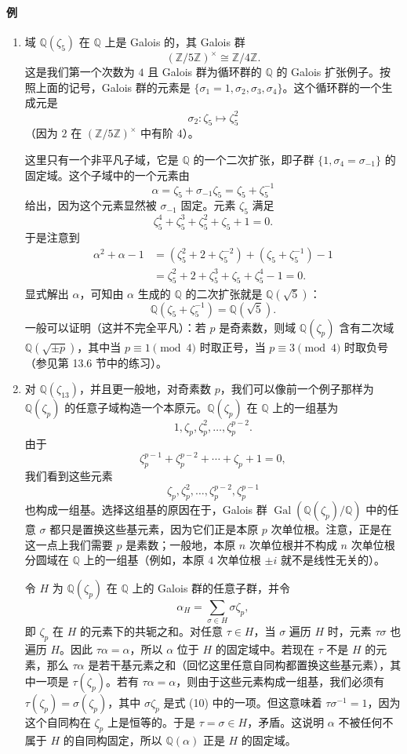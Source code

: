 \paragraph{例}
\begin{enumerate}[label=(\arabic*)]
\item 域 $\mathbb Q(\zeta_5)$ 在 $\mathbb Q$ 上是 Galois 的，其 Galois 群
\[
(\mathbb Z/5\mathbb Z)^\times\cong \mathbb Z/4\mathbb Z.
\]
这是我们第一个次数为 $4$ 且 Galois 群为循环群的 $\mathbb Q$ 的 Galois 扩张例子。按照上面的记号，Galois 群的元素是 $\{\sigma_1=1,\sigma_2,\sigma_3,\sigma_4\}$。这个循环群的一个生成元是
\[
\sigma_2:\zeta_5\longmapsto \zeta_5^2
\]
（因为 $2$ 在 $(\mathbb Z/5\mathbb Z)^\times$ 中有阶 $4$）。

这里只有一个非平凡子域，它是 $\mathbb Q$ 的一个二次扩张，即子群 $\{1,\sigma_4=\sigma_{-1}\}$ 的固定域。这个子域中的一个元素由
\[
\alpha=\zeta_5+\sigma_{-1}\zeta_5=\zeta_5+\zeta_5^{-1}
\]
给出，因为这个元素显然被 $\sigma_{-1}$ 固定。元素 $\zeta_5$ 满足
\[
\zeta_5^4+\zeta_5^3+\zeta_5^2+\zeta_5+1=0.
\]
于是注意到
\[
\begin{aligned}
\alpha^2+\alpha-1
&=(\zeta_5^2+2+\zeta_5^{-2})+(\zeta_5+\zeta_5^{-1})-1\\
&=\zeta_5^2+2+\zeta_5^3+\zeta_5+\zeta_5^4-1=0.
\end{aligned}
\]
显式解出 $\alpha$，可知由 $\alpha$ 生成的 $\mathbb Q$ 的二次扩张就是 $\mathbb Q(\sqrt 5)$：
\[
\mathbb Q(\zeta_5+\zeta_5^{-1})=\mathbb Q(\sqrt 5).
\]
一般可以证明（这并不完全平凡）：若 $p$ 是奇素数，则域 $\mathbb Q(\zeta_p)$ 含有二次域 $\mathbb Q(\sqrt{\pm p})$，其中当 $p\equiv 1\pmod 4$ 时取正号，当 $p\equiv 3\pmod 4$ 时取负号（参见第 13.6 节中的练习）。

\item 对 $\mathbb Q(\zeta_{13})$，并且更一般地，对奇素数 $p$，我们可以像前一个例子那样为 $\mathbb Q(\zeta_p)$ 的任意子域构造一个本原元。$\mathbb Q(\zeta_p)$ 在 $\mathbb Q$ 上的一组基为
\[
1,\zeta_p,\zeta_p^2,\ldots,\zeta_p^{p-2}.
\]
由于
\[
\zeta_p^{p-1}+\zeta_p^{p-2}+\cdots+\zeta_p+1=0,
\]
我们看到这些元素
\[
\zeta_p,\zeta_p^2,\ldots,\zeta_p^{p-2},\zeta_p^{p-1}
\]
也构成一组基。选择这组基的原因在于，Galois 群 $\operatorname{Gal}(\mathbb Q(\zeta_p)/\mathbb Q)$ 中的任意 $\sigma$ 都只是置换这些基元素，因为它们正是本原 $p$ 次单位根。注意，正是在这一点上我们需要 $p$ 是素数；一般地，本原 $n$ 次单位根并不构成 $n$ 次单位根分圆域在 $\mathbb Q$ 上的一组基（例如，本原 $4$ 次单位根 $\pm i$ 就不是线性无关的）。

令 $H$ 为 $\mathbb Q(\zeta_p)$ 在 $\mathbb Q$ 上的 Galois 群的任意子群，并令
\[
\alpha_H=\sum_{\sigma\in H}\sigma\zeta_p, \tag{14.10}
\]
即 $\zeta_p$ 在 $H$ 的元素下的共轭之和。对任意 $\tau\in H$，当 $\sigma$ 遍历 $H$ 时，元素 $\tau\sigma$ 也遍历 $H$。因此 $\tau\alpha=\alpha$，所以 $\alpha$ 位于 $H$ 的固定域中。若现在 $\tau$ 不是 $H$ 的元素，那么 $\tau\alpha$ 是若干基元素之和（回忆这里任意自同构都置换这些基元素），其中一项是 $\tau(\zeta_p)$。若有 $\tau\alpha=\alpha$，则由于这些元素构成一组基，我们必须有 $\tau(\zeta_p)=\sigma(\zeta_p)$，其中 $\sigma\zeta_p$ 是式 (10) 中的一项。但这意味着 $\tau\sigma^{-1}=1$，因为这个自同构在 $\zeta_p$ 上是恒等的。于是 $\tau=\sigma\in H$，矛盾。这说明 $\alpha$ 不被任何不属于 $H$ 的自同构固定，所以 $\mathbb Q(\alpha)$ 正是 $H$ 的固定域。


\end{enumerate}
